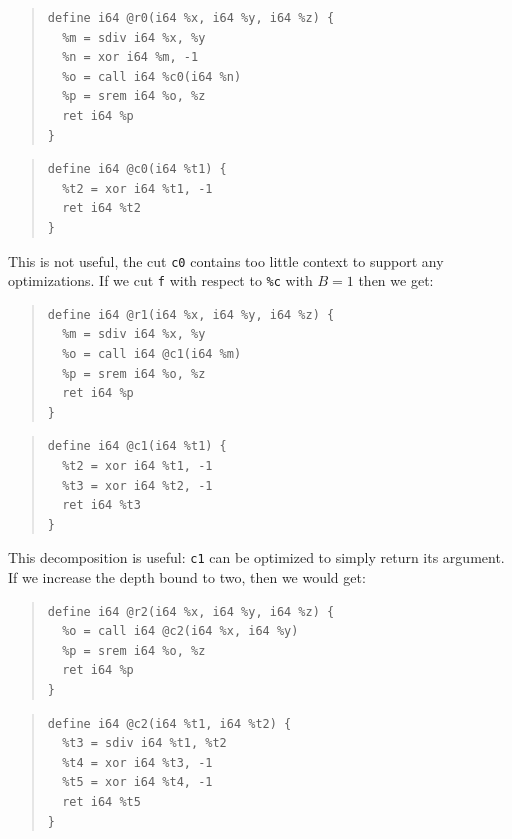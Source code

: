 \begin{multicols}{2}
{\begin{quote}
\begin{verbatim}
define i64 @r0(i64 %x, i64 %y, i64 %z) {
  %m = sdiv i64 %x, %y
  %n = xor i64 %m, -1
  %o = call i64 %c0(i64 %n)
  %p = srem i64 %o, %z
  ret i64 %p
}
\end{verbatim}
\end{quote}}
\columnbreak
{\begin{quote}
\begin{verbatim}
define i64 @c0(i64 %t1) {
  %t2 = xor i64 %t1, -1
  ret i64 %t2
}
\end{verbatim}
\end{quote}}
\end{multicols}

This is not useful, the cut \texttt{c0} contains too little context
to support any optimizations.
%
If we cut \texttt{f} with respect to \texttt{\%c} with $B = 1$ then we get:

\begin{multicols}{2}
{\begin{quote}
\begin{verbatim}
define i64 @r1(i64 %x, i64 %y, i64 %z) {
  %m = sdiv i64 %x, %y
  %o = call i64 @c1(i64 %m)
  %p = srem i64 %o, %z
  ret i64 %p
}
\end{verbatim}
\end{quote}}
\columnbreak
{\begin{quote}
\begin{verbatim}
define i64 @c1(i64 %t1) {
  %t2 = xor i64 %t1, -1
  %t3 = xor i64 %t2, -1
  ret i64 %t3
}
\end{verbatim}
\end{quote}}
\end{multicols}

This decomposition is useful: \texttt{c1} can be optimized to simply
return its argument.
%
If we increase the depth bound to two, then we would get:

\begin{multicols}{2}
{\begin{quote}
\begin{verbatim}
define i64 @r2(i64 %x, i64 %y, i64 %z) {
  %o = call i64 @c2(i64 %x, i64 %y)
  %p = srem i64 %o, %z
  ret i64 %p
}
\end{verbatim}
\end{quote}}
\columnbreak
{\begin{quote}
\begin{verbatim}
define i64 @c2(i64 %t1, i64 %t2) {
  %t3 = sdiv i64 %t1, %t2
  %t4 = xor i64 %t3, -1
  %t5 = xor i64 %t4, -1
  ret i64 %t5
}
\end{verbatim}
\end{quote}}
\end{multicols}

